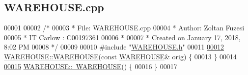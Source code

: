 \hypertarget{_w_a_r_e_h_o_u_s_e_8cpp_source}{}\subsection{W\+A\+R\+E\+H\+O\+U\+S\+E.\+cpp}

\begin{DoxyCode}
00001 
00002 \textcolor{comment}{/* }
00003 \textcolor{comment}{ * File:   WAREHOUSE.cpp}
00004 \textcolor{comment}{ * Author: Zoltan Fuzesi}
00005 \textcolor{comment}{ * IT Carlow : C00197361}
00006 \textcolor{comment}{ *}
00007 \textcolor{comment}{ * Created on January 17, 2018, 8:02 PM}
00008 \textcolor{comment}{ */}
00009 
00010 \textcolor{preprocessor}{#include "\hyperlink{_w_a_r_e_h_o_u_s_e_8h}{WAREHOUSE.h}"}
00011 
\hypertarget{_w_a_r_e_h_o_u_s_e_8cpp_source.tex_l00012}{}\hyperlink{class_w_a_r_e_h_o_u_s_e_a4782d251d2203377f8e9f331ba3b0a7e_a4782d251d2203377f8e9f331ba3b0a7e}{00012} \hyperlink{class_w_a_r_e_h_o_u_s_e_a7a924d389af91f54ed0e1d1d8d56ec57_a7a924d389af91f54ed0e1d1d8d56ec57}{WAREHOUSE::WAREHOUSE}(\textcolor{keyword}{const} \hyperlink{class_w_a_r_e_h_o_u_s_e}{WAREHOUSE}& orig) \{
00013 \}
00014 
\hypertarget{_w_a_r_e_h_o_u_s_e_8cpp_source.tex_l00015}{}\hyperlink{class_w_a_r_e_h_o_u_s_e_ad5aa686839d7be9bfea33d469c58086b_ad5aa686839d7be9bfea33d469c58086b}{00015} \hyperlink{class_w_a_r_e_h_o_u_s_e_ad5aa686839d7be9bfea33d469c58086b_ad5aa686839d7be9bfea33d469c58086b}{WAREHOUSE::~WAREHOUSE}() \{
00016 \}
00017 
\end{DoxyCode}
